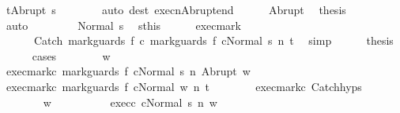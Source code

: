 \begin{isabellebody}
\ {\isachardoublequoteopen}t{\isacharequal}Abrupt\ s{\isacharprime}{\isachardoublequoteclose}\isanewline
\ \ \ \ \ \ \isamarkupfalse%
\ {\isacharparenleft}auto\ dest{\isacharcolon}\ execn{\isacharunderscore}Abrupt{\isacharunderscore}end{\isacharparenright}\isanewline
\ \ \ \ \isamarkupfalse%
\ Abrupt\ \isamarkupfalse%
\ {\isacharquery}thesis\isanewline
\ \ \ \ \ \ \isamarkupfalse%
\ auto\isanewline
\ \ \isamarkupfalse%
\isanewline
\ \ \ \ \isamarkupfalse%
\ {\isacharparenleft}Normal\ s{\isacharprime}{\isacharparenright}\ \isamarkupfalse%
\ s{\isacharequal}this\isanewline
\ \ \ \ \isamarkupfalse%
\ exec{\isacharunderscore}mark\ \isamarkupfalse%
\ \isanewline
\ \ \ \ \ \ {\isachardoublequoteopen}{\isasymGamma}{\isasymturnstile}{\isasymlangle}Catch\ {\isacharparenleft}mark{\isacharunderscore}guards\ f\ c{}{\isacharparenright}\ {\isacharparenleft}mark{\isacharunderscore}guards\ f\ c{}{\isacharparenright}{\isacharcomma}Normal\ s{\isacharprime}{\isasymrangle}\ {\isacharequal}n{\isasymRightarrow}\ t{\isachardoublequoteclose}\ \isamarkupfalse%
\ simp\isanewline
\ \ \ \ \isamarkupfalse%
\ {\isacharquery}thesis\isanewline
\ \ \ \ \isamarkupfalse%
\ {\isacharparenleft}cases{\isacharparenright}\isanewline
\ \ \ \ \ \ \isamarkupfalse%
\ w\isanewline
\ \ \ \ \ \ \isamarkupfalse%
\ exec{\isacharunderscore}mark{\isacharunderscore}c{}{\isacharcolon}\ {\isachardoublequoteopen}{\isasymGamma}{\isasymturnstile}{\isasymlangle}mark{\isacharunderscore}guards\ f\ c{}{\isacharcomma}Normal\ s{\isacharprime}{\isasymrangle}\ {\isacharequal}n{\isasymRightarrow}\ Abrupt\ w{\isachardoublequoteclose}\isanewline
\ \ \ \ \ \ \isamarkupfalse%
\ exec{\isacharunderscore}mark{\isacharunderscore}c{}{\isacharcolon}\ {\isachardoublequoteopen}{\isasymGamma}{\isasymturnstile}{\isasymlangle}mark{\isacharunderscore}guards\ f\ c{}{\isacharcomma}Normal\ w{\isasymrangle}\ {\isacharequal}n{\isasymRightarrow}\ t{\isachardoublequoteclose}\isanewline
\ \ \ \ \ \ \isamarkupfalse%
\ exec{\isacharunderscore}mark{\isacharunderscore}c{}\ Catch{\isachardot}hyps\ \isanewline
\ \ \ \ \ \ \isamarkupfalse%
\ w{\isacharprime}\ \ \isanewline
\ \ \ \ \ \ \ \ exec{\isacharunderscore}c{}{\isacharcolon}\ {\isachardoublequoteopen}{\isasymGamma}{\isasymturnstile}{\isasymlangle}c{}{\isacharcomma}Normal\ s{\isacharprime}{\isasymrangle}\ {\isacharequal}n{\isasymRightarrow}\ w{\isacharprime}{\isachardoublequoteclose}\ \isanewline

\end{isabellebody}
